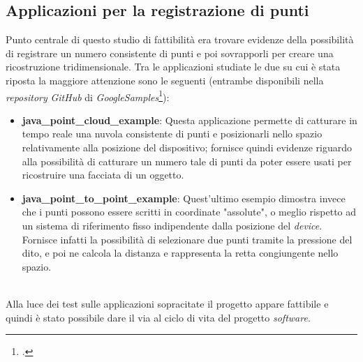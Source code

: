 \subsection{Applicazioni per la registrazione di punti}
Punto centrale di questo studio di fattibilità era trovare evidenze della possibilità di registrare un numero consistente di punti e poi sovrapporli per creare una ricostruzione tridimensionale.
Tra le applicazioni studiate le due su cui è stata riposta la maggiore attenzione sono le seguenti (entrambe disponibili nella \emph{repository} \emph{GitHub} di \emph{GoogleSamples}\footcite{site: https://github.com/googlesamples/tango-examples-java/tree/master}):
\begin{itemize}
	\item \textbf{java\_point\_cloud\_example}: Questa applicazione permette di catturare in tempo reale una nuvola consistente di punti e posizionarli nello spazio relativamente alla posizione del dispositivo; fornisce quindi evidenze riguardo alla possibilità di catturare un numero tale di punti da poter essere usati per ricostruire una facciata di un oggetto.
	\item \textbf{java\_point\_to\_point\_example}: Quest'ultimo esempio dimostra invece che i punti possono essere scritti in coordinate "assolute", o meglio rispetto ad un sistema di riferimento fisso indipendente dalla posizione del \emph{device}. Fornisce infatti la possibilità di selezionare due punti tramite la pressione del dito, e poi ne calcola la distanza e rappresenta la retta congiungente nello spazio.
\end{itemize}
\ \\
Alla luce dei test sulle applicazioni sopracitate il progetto appare fattibile e quindi è stato possibile dare il via al ciclo di vita del progetto \emph{software}.










